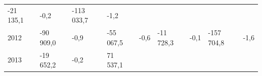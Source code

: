 \begin{longtable}[]{@{}lllllllll@{}}
\begin{minipage}[t]{0.12\columnwidth}
-21 135,1\strut
\end{minipage} & \begin{minipage}[t]{0.06\columnwidth}\raggedright
-0,2\strut
\end{minipage} & \begin{minipage}[t]{0.09\columnwidth}\raggedright
-113 033,7\strut
\end{minipage} & \begin{minipage}[t]{0.06\columnwidth}\raggedright
-1,2\strut
\end{minipage}\tabularnewline
\begin{minipage}[t]{0.05\columnwidth}\raggedright
2012\strut
\end{minipage} & \begin{minipage}[t]{0.10\columnwidth}\raggedright
-90 909,0\strut
\end{minipage} & \begin{minipage}[t]{0.06\columnwidth}\raggedright
-0,9\strut
\end{minipage} & \begin{minipage}[t]{0.16\columnwidth}\raggedright
-55 067,5\strut
\end{minipage} & \begin{minipage}[t]{0.06\columnwidth}\raggedright
-0,6\strut
\end{minipage} & \begin{minipage}[t]{0.12\columnwidth}\raggedright
-11 728,3\strut
\end{minipage} & \begin{minipage}[t]{0.06\columnwidth}\raggedright
-0,1\strut
\end{minipage} & \begin{minipage}[t]{0.09\columnwidth}\raggedright
-157 704,8\strut
\end{minipage} & \begin{minipage}[t]{0.06\columnwidth}\raggedright
-1,6\strut
\end{minipage}\tabularnewline
\begin{minipage}[t]{0.05\columnwidth}\raggedright
2013\strut
\end{minipage} & \begin{minipage}[t]{0.10\columnwidth}\raggedright
-19 652,2\strut
\end{minipage} & \begin{minipage}[t]{0.06\columnwidth}\raggedright
-0,2\strut
\end{minipage} & \begin{minipage}[t]{0.16\columnwidth}\raggedright
71 537,1\strut

\end{minipage}
\end{longtable}
